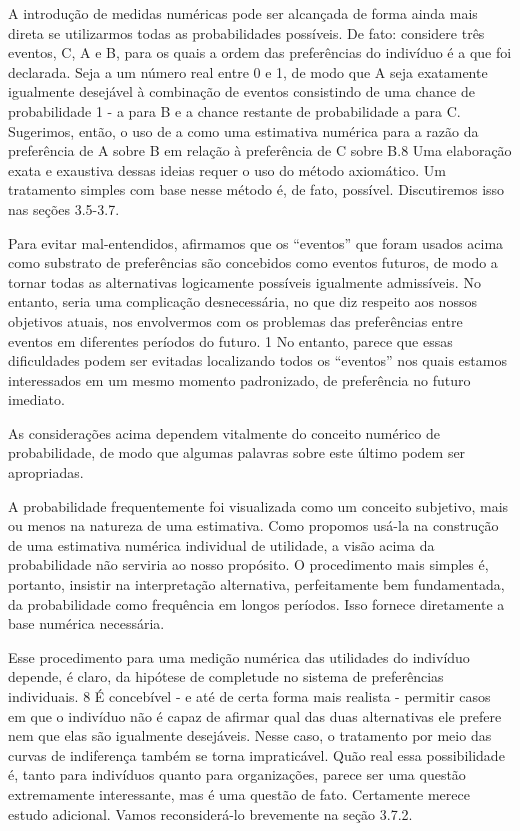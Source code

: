 \documentclass[12pt]{article}
\begin{document}
A introdução de medidas numéricas pode ser alcançada de forma ainda mais direta se utilizarmos todas as probabilidades possíveis. De fato: considere três eventos, C, A e B, para os quais a ordem das preferências do indivíduo é a que foi declarada. Seja a um número real entre 0 e 1, de modo que A seja exatamente igualmente desejável à combinação de eventos consistindo de uma chance de probabilidade 1 - a para B e a chance restante de probabilidade a para C. Sugerimos, então, o uso de a como uma estimativa numérica para a razão da preferência de A sobre B em relação à preferência de C sobre B.8 Uma elaboração exata e exaustiva dessas ideias requer o uso do método axiomático. Um tratamento simples com base nesse método é, de fato, possível. Discutiremos isso nas seções 3.5-3.7.

Para evitar mal-entendidos, afirmamos que os “eventos” que foram usados acima como substrato de preferências são concebidos como eventos futuros, de modo a tornar todas as alternativas logicamente possíveis igualmente admissíveis. No entanto, seria uma complicação desnecessária, no que diz respeito aos nossos objetivos atuais, nos envolvermos com os problemas das preferências entre eventos em diferentes períodos do futuro. 1 No entanto, parece que essas dificuldades podem ser evitadas localizando todos os “eventos” nos quais estamos interessados em um mesmo momento padronizado, de preferência no futuro imediato.

As considerações acima dependem vitalmente do conceito numérico de probabilidade, de modo que algumas palavras sobre este último podem ser apropriadas.

A probabilidade frequentemente foi visualizada como um conceito subjetivo, mais ou menos na natureza de uma estimativa. Como propomos usá-la na construção de uma estimativa numérica individual de utilidade, a visão acima da probabilidade não serviria ao nosso propósito. O procedimento mais simples é, portanto, insistir na interpretação alternativa, perfeitamente bem fundamentada, da probabilidade como frequência em longos períodos. Isso fornece diretamente a base numérica necessária.

Esse procedimento para uma medição numérica das utilidades do indivíduo depende, é claro, da hipótese de completude no sistema de preferências individuais. 8 É concebível - e até de certa forma mais realista - permitir casos em que o indivíduo não é capaz de afirmar qual das duas alternativas ele prefere nem que elas são igualmente desejáveis. Nesse caso, o tratamento por meio das curvas de indiferença também se torna impraticável.
Quão real essa possibilidade é, tanto para indivíduos quanto para organizações, parece ser uma questão extremamente interessante, mas é uma questão de fato. Certamente merece estudo adicional. Vamos reconsiderá-lo brevemente na seção 3.7.2.
\end{document}

